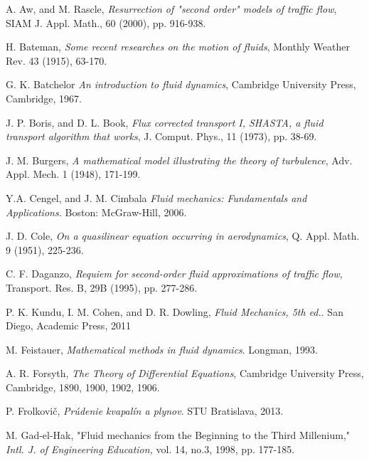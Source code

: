 \documentclass[../include.tex]{subfiles}
\begin{document}
	\renewcommand{\bibname}{REFERENCES}
	
\begin{thebibliography}{99}
	\thispagestyle{headings}

	 {\sc A. Aw, and M. Rascle},
	{\em Resurrection of "second order" models of traffic flow}, SIAM J. Appl. Math., 60 (2000), pp. 916-938.

	 {\sc H. Bateman},
	{\em Some recent researches on the motion of fluids}, Monthly Weather Rev. 43 (1915), 63-170.

	 {\sc G. K. Batchelor}
	{\em An introduction to fluid dynamics}, Cambridge University Press, Cambridge, 1967.

	 {\sc J. P. Boris, and D. L. Book},
	{\em Flux corrected transport I, SHASTA, a fluid transport algorithm that works}, J. Comput. Phys., 11 (1973), pp. 38-69.

	 {\sc J. M. Burgers},
	{\em A mathematical model illustrating the theory of turbulence}, Adv. Appl. Mech. 1 (1948), 171-199.

	 {\sc Y.A. Cengel, and J. M. Cimbala}
	{\em Fluid mechanics: Fundamentals and Applications.} Boston: McGraw-Hill, 2006.

	 {\sc J. D. Cole},
	{\em On a quasilinear equation occurring in aerodynamics}, Q. Appl. Math. 9 (1951), 225-236.

	 {\sc C. F. Daganzo},
	{\em Requiem for second-order fluid approximations of traffic flow}, Transport. Res. B, 29B (1995), pp. 277-286.

	 {\sc P. K. Kundu, I. M. Cohen, and D. R. Dowling},
	{\em Fluid Mechanics, 5th ed.}. San Diego, Academic Press, 2011

	 {\sc M. Feistauer},
	{\em Mathematical methods in fluid dynamics}. Longman, 1993.

	 {\sc A. R. Forsyth},
	{\em The Theory of Differential Equations}, Cambridge University Press, Cambridge, 1890, 1900, 1902, 1906.

	 {\sc P. Frolkovič},
	{\em Prúdenie kvapalín a plynov}. STU Bratislava, 2013.

	 {\sc M. Gad-el-Hak}, "Fluid mechanics from the Beginning to the Third Millenium,"
	{\em Intl. J. of Engineering Education, } vol. 14, no.3, 1998, pp. 177-185.


\end{thebibliography}
\end{document}
